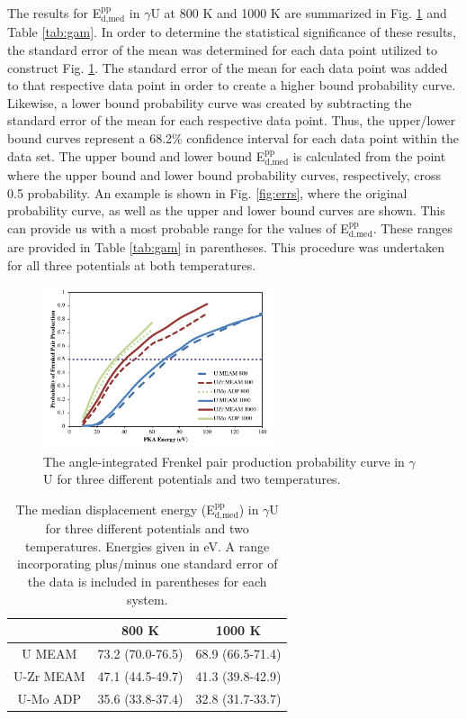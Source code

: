 \documentclass[review]{elsarticle}
\begin{document}
The results for E$^{\textrm{pp}}_{\textrm{d,med}}$ in $\gamma$U at 800 K and 1000 K are summarized in Fig. \ref{fig:800_1000} and Table \ref{tab:gam}. In order to determine the statistical significance of these results, the standard error of the mean was determined for each data point utilized to construct Fig. \ref{fig:800_1000}. The standard error of the mean for each data point was added to that respective data point in order to create a higher bound probability curve. Likewise, a lower bound probability curve was created by subtracting the standard error of the mean for each respective data point. Thus, the upper/lower bound curves represent a 68.2\% confidence interval for each data point within the data set. The upper bound and lower bound E$^{\textrm{pp}}_{\textrm{d,med}}$ is calculated from the point where the upper bound and lower bound probability curves, respectively, cross 0.5 probability. An example is shown in Fig. \ref{fig:errs}, where the original probability curve, as well as the upper and lower bound curves are shown. This can provide us with a most probable range for the values of E$^{\textrm{pp}}_{\textrm{d,med}}$. These ranges are provided in Table \ref{tab:gam} in parentheses. This procedure was undertaken for all three potentials at both temperatures.

\begin{figure}[h]
 \centering
 \includegraphics[width=0.6\textwidth]{800_1000A.png} 
 \caption{The angle-integrated Frenkel pair production probability curve in $\gamma$U for three different potentials and two temperatures.}
 \label{fig:800_1000}
\end{figure}

\begin{table}[h]
\caption{The median displacement energy (E$^{\textrm{pp}}_{\textrm{d,med}}$) in $\gamma$U for three different potentials and two temperatures. Energies given in eV. A range incorporating plus/minus one standard error of the data is included in parentheses for each system.} \label{tab:gam}
\begin{center}
\begin{tabular}{|c|c|c|}
	\hline
	& 800 K & 1000 K \\
	 \hline
	 U MEAM & 73.2 (70.0-76.5) & 68.9 (66.5-71.4) \\
	 U-Zr MEAM & 47.1 (44.5-49.7) & 41.3 (39.8-42.9) \\
	 U-Mo ADP & 35.6 (33.8-37.4) & 32.8 (31.7-33.7) \\
	 \hline
\end{tabular}
\end{center}
\label{default}
\end{table}
\end{document}
